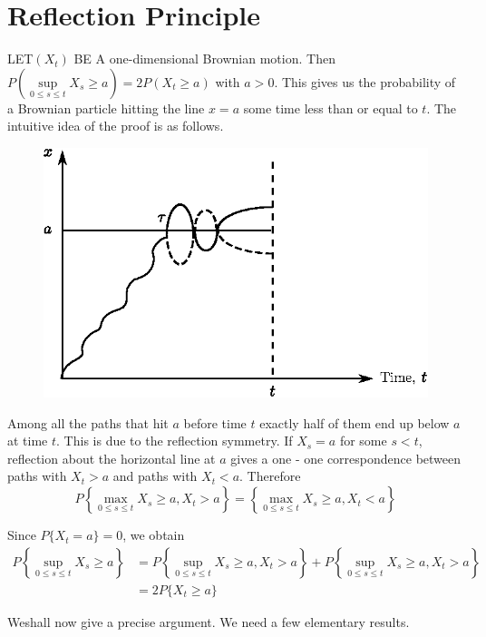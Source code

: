 \chapter{Reflection Principle}\label{chap7}

LET\pageoriginale $(X_{t})$ BE A one-dimensional Brownian motion. Then
$P(\sup\limits_{0\leq s\leq t}X_{s}\geq a)=2P(X_{t}\geq a)$ with
$a>0$. This gives us the probability of a Brownian particle hitting
the line $x=a$ some time less than or equal to $t$. The intuitive idea
of the proof is as follows.
\begin{figure}[H]
\centering
\includegraphics{figure/fig5.eps}
\end{figure}

Among all the paths that hit $a$ before time $t$ exactly half of them
end up below $a$ at time $t$. This is due to the reflection
symmetry. If $X_{s}=a$ for some $s<t$, reflection about the horizontal
line at $a$ gives a one - one correspondence between paths with
$X_{t}>a$ and paths with $X_{t}<a$. Therefore
$$
P\left\{\max\limits_{0\leq s\leq t}X_{s}\geq a,
X_{t}>a\right\}=\left\{\max\limits_{0\leq s\leq t}X_{s}\geq a, X_{t}<a\right\}
$$

Since $P\{X_{t}=a\}=0$, we obtain
\begin{align*}
P\left\{\sup\limits_{0\leq s\leq t}X_{s}\geq a\right\} &=
P\left\{\sup\limits_{0\leq s\leq t}X_{s}\geq
a,X_{t}>a\right\}+P\left\{\sup\limits_{0\leq s\leq t}X_{s}\geq
a,X_{t}>a\right\}\\
&= 2P\{X_{t}\geq a\}
\end{align*}

We\pageoriginale shall now give a precise argument. We need a few elementary
results.

